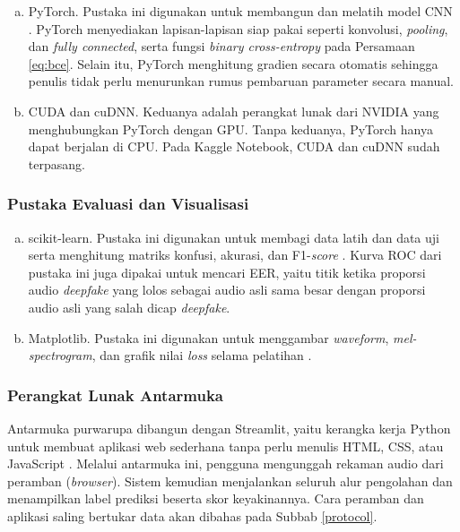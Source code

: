 \begin{enumerate}[(a).]
  \item PyTorch. Pustaka ini digunakan untuk membangun dan melatih model CNN \autocite{paszke2019pytorch}. PyTorch menyediakan lapisan-lapisan siap pakai seperti konvolusi, \textit{pooling}, dan \textit{fully connected}, serta fungsi \textit{binary cross-entropy} pada Persamaan \ref{eq:bce}. Selain itu, PyTorch menghitung gradien secara otomatis sehingga penulis tidak perlu menurunkan rumus pembaruan parameter secara manual.
  \item CUDA dan cuDNN. Keduanya adalah perangkat lunak dari NVIDIA yang menghubungkan PyTorch dengan GPU. Tanpa keduanya, PyTorch hanya dapat berjalan di CPU. Pada Kaggle Notebook, CUDA dan cuDNN sudah terpasang.
\end{enumerate}

\subsubsection{Pustaka Evaluasi dan Visualisasi}
\label{sw_eval}

\begin{enumerate}[(a).]
  \item scikit-learn. Pustaka ini digunakan untuk membagi data latih dan data uji serta menghitung matriks konfusi, akurasi, dan F1-\textit{score} \autocite{pedregosa2011scikit}. Kurva ROC dari pustaka ini juga dipakai untuk mencari EER, yaitu titik ketika proporsi audio \textit{deepfake} yang lolos sebagai audio asli sama besar dengan proporsi audio asli yang salah dicap \textit{deepfake}.
  \item Matplotlib. Pustaka ini digunakan untuk menggambar \textit{waveform}, \textit{mel-spectrogram}, dan grafik nilai \textit{loss} selama pelatihan \autocite{hunter2007matplotlib}.
\end{enumerate}

\subsubsection{Perangkat Lunak Antarmuka}
\label{sw_ui}

Antarmuka purwarupa dibangun dengan Streamlit, yaitu kerangka kerja Python untuk membuat aplikasi web sederhana tanpa perlu menulis HTML, CSS, atau JavaScript \autocite{streamlit2026docs}. Melalui antarmuka ini, pengguna mengunggah rekaman audio dari peramban (\textit{browser}). Sistem kemudian menjalankan seluruh alur pengolahan dan menampilkan label prediksi beserta skor keyakinannya. Cara peramban dan aplikasi saling bertukar data akan dibahas pada Subbab \ref{protocol}.

